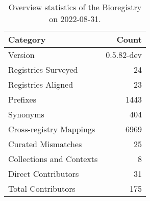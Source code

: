 \begin{table}
\centering
\caption{Overview statistics of the Bioregistry on 2022-08-31.}
\label{tab:bioregistry-summary}
\begin{tabular}{lr}
\toprule
                Category &      Count \\
\midrule
                 Version & 0.5.82-dev \\
     Registries Surveyed &         24 \\
      Registries Aligned &         23 \\
                Prefixes &       1443 \\
                Synonyms &        404 \\
 Cross-registry Mappings &       6969 \\
      Curated Mismatches &         25 \\
Collections and Contexts &          8 \\
     Direct Contributors &         31 \\
      Total Contributors &        175 \\
\bottomrule
\end{tabular}
\end{table}
